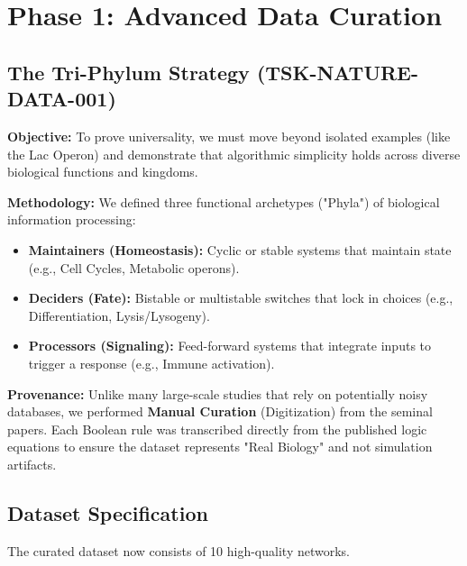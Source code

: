 \documentclass{article}
\begin{document}
\section{Phase 1: Advanced Data Curation}

\subsection{The Tri-Phylum Strategy (TSK-NATURE-DATA-001)}
\textbf{Objective:} To prove universality, we must move beyond isolated examples (like the Lac Operon) and demonstrate that algorithmic simplicity holds across diverse biological functions and kingdoms.

\textbf{Methodology:}
We defined three functional archetypes ("Phyla") of biological information processing:
\begin{itemize}
    \item \textbf{Maintainers (Homeostasis):} Cyclic or stable systems that maintain state (e.g., Cell Cycles, Metabolic operons).
    \item \textbf{Deciders (Fate):} Bistable or multistable switches that lock in choices (e.g., Differentiation, Lysis/Lysogeny).
    \item \textbf{Processors (Signaling):} Feed-forward systems that integrate inputs to trigger a response (e.g., Immune activation).
\end{itemize}

\textbf{Provenance:}
Unlike many large-scale studies that rely on potentially noisy databases, we performed \textbf{Manual Curation} (Digitization) from the seminal papers. Each Boolean rule was transcribed directly from the published logic equations to ensure the dataset represents "Real Biology" and not simulation artifacts.

\subsection{Dataset Specification}
The curated dataset now consists of 10 high-quality networks.
\end{document}
